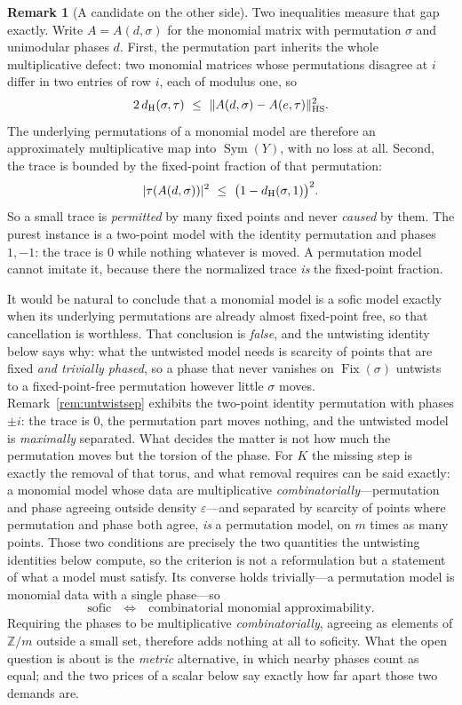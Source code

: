 \documentclass[11pt]{amsart}
\theoremstyle{definition}
\newtheorem{remark}[theorem]{Remark}
\theoremstyle{plain}
\newcommand{\Z}{\mathbb Z}
\newcommand{\Sym}{\operatorname{Sym}}
\newcommand{\Fix}{\operatorname{Fix}}
\newcommand{\eps}{\varepsilon}
\newcommand{\distH}{d_{\mathrm H}}
\DeclarePairedDelimiter{\abs}{\lvert}{\rvert}
\DeclarePairedDelimiter{\norm}{\lVert}{\rVert}
\begin{document}
\begin{remark}[A candidate on the other side]
Two inequalities measure that gap exactly.  Write \(A=A(d,\sigma)\) for the monomial matrix with permutation \(\sigma\) and unimodular phases \(d\).  First, the permutation part inherits the whole multiplicative defect: two monomial matrices whose permutations disagree at \(i\) differ in two entries of row \(i\), each of modulus one, so
\[
 2\,\distH(\sigma,\tau)\ \leq\ \norm{A(d,\sigma)-A(e,\tau)}^2_{\mathrm{HS}} .
\]
The underlying permutations of a monomial model are therefore an approximately multiplicative map into \(\Sym(Y)\), with no loss at all.  Second, the trace is bounded by the fixed-point fraction of that permutation:
\[
 \abs{\tau(A(d,\sigma))}^2\ \leq\ \bigl(1-\distH(\sigma,1)\bigr)^2 .
\]
So a small trace is \emph{permitted} by many fixed points and never \emph{caused} by them.  The purest instance is a two-point model with the identity permutation and phases \(1,-1\): the trace is \(0\) while nothing whatever is moved.  A permutation model cannot imitate it, because there the normalized trace \emph{is} the fixed-point fraction.

It would be natural to conclude that a monomial model is a sofic model exactly when its underlying permutations are already almost fixed-point free, so that cancellation is worthless.  That conclusion is \emph{false}, and the untwisting identity below says why: what the untwisted model needs is scarcity of points that are fixed \emph{and trivially phased}, so a phase that never vanishes on \(\Fix(\sigma)\) untwists to a fixed-point-free permutation however little \(\sigma\) moves.  Remark~\ref{rem:untwistsep} exhibits the two-point identity permutation with phases \(\pm i\): the trace is \(0\), the permutation part moves nothing, and the untwisted model is \emph{maximally} separated.  What decides the matter is not how much the permutation moves but the torsion of the phase.  For \(K\) the missing step is exactly the removal of that torus, and what removal requires can be said exactly: a monomial model whose data are multiplicative \emph{combinatorially}---permutation and phase agreeing outside density \(\eps\)---and separated by scarcity of points where permutation and phase both agree, \emph{is} a permutation model, on \(m\) times as many points.  Those two conditions are precisely the two quantities the untwisting identities below compute, so the criterion is not a reformulation but a statement of what a model must satisfy.  Its converse holds trivially---a permutation model is monomial data with a single phase---so
\[
 \text{sofic}\quad\Longleftrightarrow\quad
 \text{combinatorial monomial approximability.}
\]
Requiring the phases to be multiplicative \emph{combinatorially}, agreeing as elements of \(\Z/m\) outside a small set, therefore adds nothing at all to soficity.  What the open question is about is the \emph{metric} alternative, in which nearby phases count as equal; and the two prices of a scalar below say exactly how far apart those two demands are.


\end{remark}
\end{document}
